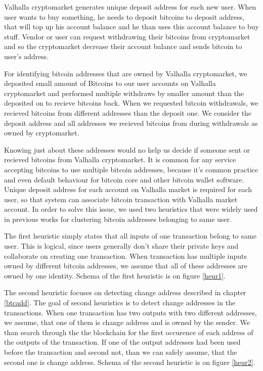\documentclass[
  digital, %
  table,   %
  lof,     %
  lot,     %
  oneside
]{fithesis3}
\begin{document}
Valhalla cryptomarket generates unique deposit address for each new user.
When user wants to buy something, he needs to deposit bitcoins to deposit address,
that will top up his account balance and he than uses this account balance to buy stuff.
Vendor or user can request withdrawing their bitcoins from cryptomarket and so
the cryptomarket decrease their account balance and sends bitcoin to user's address.

For identifying bitcoin addresses that are owned by Valhalla cryptomarket, we 
deposited small amount of Bitcoins to our user accounts on Valhalla cryptomarket and
performed multiple withdraws by smaller amount than the deposited on to recieve bitcoins back.
When we requested bitcoin withdrawals, we recieved bitcoins from different addresses
than the deposit one. We consider the deposit address and all addresses we recieved
bitcoins from during withdrawals as owned by cryptomarket.

Knowing just about these addresses would no help us decide
if someone sent or recieved bitcoins from Valhalla cryptomarket.
It is common for any service accepting bitcoins to
use multiple bitcoin addresses, because it's common practice and even default behaviour for
bitcoin core and other bitcoin wallet software. Unique deposit address for each
account on Valhalla market is required for each user, so that system can associate
bitcoin transaction with Valhalla market account.
In order to solve this issue, we used two heuristics that were widely used
in previous works \cite{androulaki2013evaluating}\cite{reid2013analysis}
for clustering bitcoin addresses belonging to same user.

The first heuristic simply states that all inputs of one transaction belong to same user. This is logical,
since users generally don't share their private keys and collaborate on creating one transaction.
When transaction has multiple inputs owned by different bitcoin addresses, we assume that all of these addresses are owned by
one identity. Schema of the first heuristic is on figure \ref{heur1}.

The second heuristic focuses on detecting change address described in chapter \ref{btcadd}.
The goal of second heuristics is to detect change addresses in the transactions.
When one transaction has two outputs with two different addresses, we assume, that one of them is change
address and is owned by the sender.
We than search through the the blockchain for the first occurence of each address of the outputs of the 
transaction. If one of the output addresses had been used before the transaction and second not,
than we can safely assume, that the second one is change address\cite{androulaki2013evaluating}.
Schema of the second heuristic is on figure \ref{heur2}.
\end{document}
